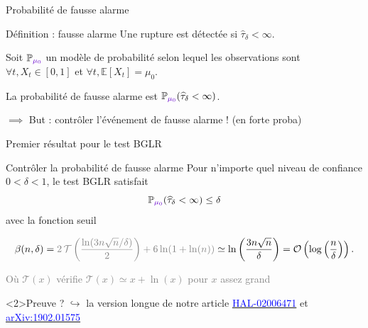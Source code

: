 \documentclass[11pt,french,ignorenonframetext,]{beamer}
\begin{document}
\begin{frame}{Probabilité de fausse alarme}


  \begin{block}{Définition : fausse alarme}
    Une rupture est détectée si $\widehat{\tau}_\delta < \infty$.
    \vspace*{10pt}

    Soit $\mathbb{P}_{\textcolor{deeppurple}{\mu_0}}$ un modèle de probabilité selon lequel les observations sont $\forall t, X_t \in[0,1]$
    et \textcolor{deeppurple}{$\forall t, \mathbb{E}[X_t] = \mu_0$}.
    \vspace*{10pt}

    La \alert{probabilité de fausse alarme} est $\mathbb{P}_{\textcolor{deeppurple}{\mu_0}}(\widehat{\tau}_\delta < \infty)$.
  \end{block}

  \alert{$\implies$ But : contrôler l'événement de fausse alarme !} (en forte proba)

\end{frame}

\begin{frame}{Premier résultat pour le test BGLR \dSmiley{}}

  \begin{block}{Contrôler la probabilité de fausse alarme}
    Pour n'importe quel \alert{niveau de confiance} $0<\delta<1$,
    le test BGLR satisfait
    \[ \mathbb{P}_{\textcolor{deeppurple}{\mu_0}}(\widehat{\tau}_\delta < \infty) \leq \delta \]
    avec la fonction seuil
    \begin{small}
      \[ \beta(n,\delta) = \textcolor{gray}{2\,\mathcal{T}\left(\frac{\ln(3n\sqrt{n}/\delta)}{2}\right) + 6\ln(1+\ln(n))} \simeq \ln\left(\frac{3n \sqrt{n}}{\delta}\right) = \mathcal{O}\left(\log\left(\frac{n}{\delta}\right)\right).\]
    \end{small}
    \begin{footnotesize}
      \textcolor{gray}{Où $\mathcal{T}(x)$ vérifie $\mathcal{T}(x)\simeq x + \ln(x)$ pour $x$ assez grand}
    \end{footnotesize}
  \end{block}

  \begin{small}
    \begin{exampleblock}<2>{Preuve ?}
      $\hookrightarrow$ la version longue de notre article
      \href{https://hal.inria.fr/hal-02006471}{\textcolor{blue}{HAL-02006471}}
      et
      \href{https://arxiv.org/abs/1902.01575}{\textcolor{blue}{arXiv:1902.01575}}
    \end{exampleblock}
  \end{small}

\end{frame}
\end{document}
